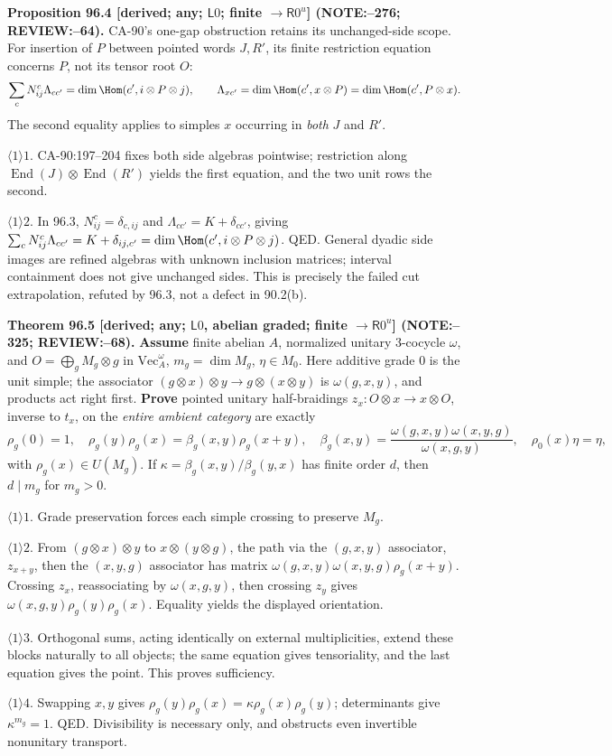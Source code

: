 \textbf{Proposition 96.4 [derived; any; \(\mathsf L0\); finite \(\to\mathsf R0^u\)] (NOTE:--276; REVIEW:--64).}
CA-90's one-gap obstruction retains its unchanged-side scope. For insertion of \(P\) between pointed words
\(J,R'\), its finite restriction equation concerns \(P\), not its tensor root \(O\):
\[
 \sum_cN_{ij}^c\Lambda_{cc'}=\dim\Hom(c',i\otimes P\otimes j),\qquad
 \Lambda_{xc'}=\dim\Hom(c',x\otimes P)=\dim\Hom(c',P\otimes x).
\]
The second equality applies to simples \(x\) occurring in \emph{both} \(J\) and \(R'\).
\par\(\langle1\rangle1\). CA-90:197--204 fixes both side algebras pointwise; restriction along
\(\operatorname{End}(J)\otimes\operatorname{End}(R')\) yields the first equation, and the two unit rows the second.
\par\(\langle1\rangle2\). In 96.3, \(N_{ij}^c=\delta_{c,ij}\) and \(\Lambda_{cc'}=K+\delta_{cc'}\), giving
\(\sum_cN_{ij}^c\Lambda_{cc'}=K+\delta_{ij,c'}=\dim\Hom(c',i\otimes P\otimes j)\). QED.
General dyadic side images are refined algebras with unknown inclusion matrices; interval containment does not
give unchanged sides. This is precisely the failed cut extrapolation, refuted by 96.3, not a defect in 90.2(b).

\textbf{Theorem 96.5 [derived; any; \(\mathsf L0\), abelian graded; finite \(\to\mathsf R0^u\)] (NOTE:--325; REVIEW:--68).}
\textbf{Assume} finite abelian \(A\), normalized unitary 3-cocycle \(\omega\), and
\(O=\bigoplus_g M_g\otimes g\) in \(\mathrm{Vec}_A^\omega\), \(m_g=\dim M_g\), \(\eta\in M_0\).
Here additive grade 0 is the unit simple; the associator \((g\otimes x)\otimes y\to g\otimes(x\otimes y)\)
is \(\omega(g,x,y)\), and products act right first. \textbf{Prove} pointed unitary half-braidings
\(z_x:O\otimes x\to x\otimes O\), inverse to \(t_x\), on the \emph{entire ambient category} are exactly
\[
 \rho_g(0)=1,\quad \rho_g(y)\rho_g(x)=\beta_g(x,y)\rho_g(x+y),\quad
 \beta_g(x,y)=\frac{\omega(g,x,y)\omega(x,y,g)}{\omega(x,g,y)},\quad \rho_0(x)\eta=\eta,
\]
with \(\rho_g(x)\in U(M_g)\). If \(\kappa=\beta_g(x,y)/\beta_g(y,x)\) has finite order \(d\), then \(d\mid m_g\) for \(m_g>0\).
\par\(\langle1\rangle1\). Grade preservation forces each simple crossing to preserve \(M_g\).
\par\(\langle1\rangle2\). From \((g\otimes x)\otimes y\) to \(x\otimes(y\otimes g)\), the path via the
\((g,x,y)\) associator, \(z_{x+y}\), then the \((x,y,g)\) associator has matrix
\(\omega(g,x,y)\omega(x,y,g)\rho_g(x+y)\). Crossing \(z_x\), reassociating by \(\omega(x,g,y)\), then crossing
\(z_y\) gives \(\omega(x,g,y)\rho_g(y)\rho_g(x)\). Equality yields the displayed orientation.
\par\(\langle1\rangle3\). Orthogonal sums, acting identically on external multiplicities, extend these blocks
naturally to all objects; the same equation gives tensoriality, and the last equation gives the point. This proves sufficiency.
\par\(\langle1\rangle4\). Swapping \(x,y\) gives \(\rho_g(y)\rho_g(x)=\kappa\rho_g(x)\rho_g(y)\);
determinants give \(\kappa^{m_g}=1\). QED. Divisibility is necessary only, and obstructs even invertible nonunitary transport.

